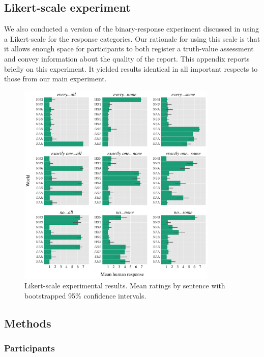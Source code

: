 \documentclass[leqno,12pt]{article}
\begin{document}
\begin{appendix}
\section{Likert-scale experiment}\label{app:likert}

We also conducted a version of the binary-response experiment
discussed in  using a Likert-scale for the response
categories.  Our rationale for using this scale is that it allows
enough space for participants to both register a truth-value
assessment and convey information about the quality of the
report. This appendix reports briefly on this experiment. It yielded
results identical in all important respects to those from our main
experiment.

\begin{figure}[t]
  \centering
  \includegraphics[width=0.85\textwidth]{fig/basketball-pilot-2-11-14-results-parsed}
  \caption{Likert-scale experimental results. Mean ratings by sentence with bootstrapped 95\% confidence intervals.}
  \label{fig:likert:results}
\end{figure}

\subsection{Methods}

\subsubsection{Participants}


\end{appendix}
\end{document}
